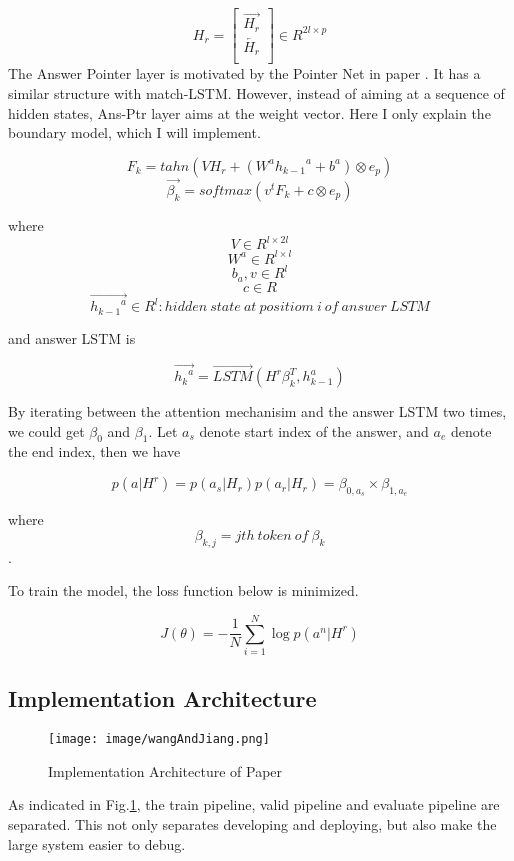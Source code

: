 \documentclass[12pt]{article}
\begin{document}
\[ H_r =
\begin{bmatrix}
\overrightarrow{H_r} \\
\overleftarrow{H_r} \\
\end{bmatrix}
\in R^{2l \times p}
\]
The Answer Pointer layer is motivated by the Pointer Net in paper \cite{vinyals2015pointer}. It has a similar structure with match-LSTM. However, instead of aiming at a sequence of hidden states, Ans-Ptr layer aims at the weight vector. Here I only explain the boundary model, which I will implement.

$$F_k = tahn(VH_r + (W^a{h_{k-1}}^a +  b^a) \otimes e_p)$$
$$\overrightarrow{\beta _k} = softmax(v^tF_k + c \otimes e_p)$$


where
$$V \in R^{l \times 2l}$$
$$W^a\in R^{l \times l} $$
$$b_a, v\in R^{l}  $$
$$c \in R $$
$$\overrightarrow{{h_{k-1}}^a}\in R^{l}: hidden\ state\ at\ positiom\ i\ of\ answer\ LSTM  $$

and answer LSTM is


$$\overrightarrow{{h_k}^a} = \overrightarrow{LSTM}(H^r\beta _k^T, h_{k-1}^a)$$

By iterating between the attention mechanisim and the answer LSTM two times, we could get $\beta _0$ and $\beta _1$. Let $a_s$ denote start index of the answer, and $a_e$ denote the end index, then we have

$$p(a|H^r) = p(a_s|H_r)p(a_r|H_r)=\beta _{0, a_s} \times \beta_{1, a_e}$$

where $$\beta_{k, j} = jth\ token\ of\ \beta _k$$.

To train the model, the loss function below is minimized.

$$J(\theta) = -\frac{1}{N}\sum_{i=1}^{N} \log{p(a^n|H^r)} $$


\subsection{Implementation Architecture}\label{sec:architectures}


\begin{figure}[h]
\texttt{[image: image/wangAndJiang.png]}
\centering
\caption{Implementation Architecture of Paper \cite{wang2016machine}}
\label{fig:wangAndJiang}
\end{figure}

As indicated in Fig.\ref{fig:wangAndJiang}, the train pipeline, valid pipeline and evaluate pipeline are separated. This not only separates developing and deploying, but also make the large system easier to debug.
\end{document}
